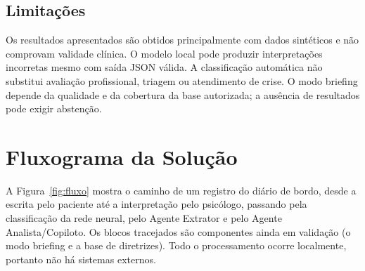 \documentclass[12pt,a4paper]{article}
\begin{document}
\subsection{Limitações}
Os resultados apresentados são obtidos principalmente com dados sintéticos e não comprovam validade clínica.
O modelo local pode produzir interpretações incorretas mesmo com saída JSON válida.
A classificação automática não substitui avaliação profissional, triagem ou atendimento de crise.
O modo briefing depende da qualidade e da cobertura da base autorizada; a ausência de resultados pode exigir abstenção.

\section{Fluxograma da Solução}

A Figura~\ref{fig:fluxo} mostra o caminho de um registro do diário de bordo, desde a escrita
pelo paciente até a interpretação pelo psicólogo, passando pela classificação da rede neural,
pelo Agente Extrator e pelo Agente Analista/Copiloto. Os blocos tracejados são componentes ainda
em validação (o modo briefing e a base de diretrizes). Todo o processamento ocorre localmente,
portanto não há sistemas externos.
\end{document}
